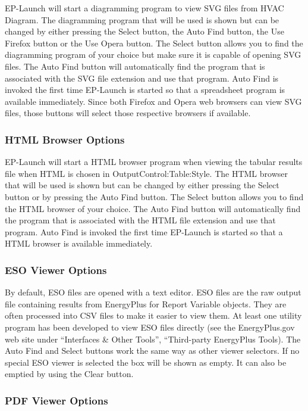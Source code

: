 EP-Launch will start a diagramming program to view SVG files from HVAC Diagram. The diagramming program that will be used is shown but can be changed by either pressing the Select button, the Auto Find button, the Use Firefox button or the Use Opera button. The Select button allows you to find the diagramming program of your choice but make sure it is capable of opening SVG files. The Auto Find button will automatically find the program that is associated with the SVG file extension and use that program. Auto Find is invoked the first time EP-Launch is started so that a spreadsheet program is available immediately. Since both Firefox and Opera web browsers can view SVG files, those buttons will select those respective browsers if available.

\subsubsection{HTML Browser Options}\label{html-browser-options}

EP-Launch will start a HTML browser program when viewing the tabular results file when HTML is chosen in OutputControl:Table:Style. The HTML browser that will be used is shown but can be changed by either pressing the Select button or by pressing the Auto Find button. The Select button allows you to find the HTML browser of your choice. The Auto Find button will automatically find the program that is associated with the HTML file extension and use that program. Auto Find is invoked the first time EP-Launch is started so that a HTML browser is available immediately.

\subsubsection{ESO Viewer Options}\label{eso-viewer-options}

By default, ESO files are opened with a text editor. ESO files are the raw output file containing results from EnergyPlus for Report Variable objects. They are often processed into CSV files to make it easier to view them. At least one utility program has been developed to view ESO files directly (see the EnergyPlus.gov web site under ``Interfaces \& Other Tools'', ``Third-party EnergyPlus Tools). The Auto Find and Select buttons work the same way as other viewer selectors. If no special ESO viewer is selected the box will be shown as empty. It can also be emptied by using the Clear button.

\subsubsection{PDF Viewer Options}\label{pdf-viewer-options}

